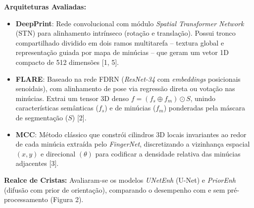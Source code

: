 \documentclass[12pt]{article}
\begin{document}
\begin{minipage}[t][89.8cm][s]{42.8cm}
  \noindent\textbf{Arquiteturas Avaliadas:}
  \begin{itemize}[leftmargin=1.1cm, itemsep=0.14cm, topsep=0.12cm, parsep=0pt]
    \item \textbf{DeepPrint}: Rede convolucional com módulo \textit{Spatial Transformer Network} (STN) para alinhamento intrínseco (rotação e translação). Possui tronco compartilhado dividido em dois ramos multitarefa -- textura global e representação guiada por mapa de minúcias -- que geram um vetor 1D compacto de 512 dimensões [1, 5].
    \item \textbf{FLARE}: Baseado na rede FDRN (\textit{ResNet-34} com \textit{embeddings} posicionais senoidais), com alinhamento de pose via regressão direta ou votação nas minúcias. Extrai um tensor 3D denso $f = (f_s \oplus f_m) \odot S$, unindo características semânticas ($f_s$) e de minúcias ($f_m$) ponderadas pela máscara de segmentação ($S$) [2].
    \item \textbf{MCC}: Método clássico que constrói cilindros 3D locais invariantes ao redor de cada minúcia extraída pelo \textit{FingerNet}, discretizando a vizinhança espacial $(x, y)$ e direcional $(\theta)$ para codificar a densidade relativa das minúcias adjacentes [3].
  \end{itemize}

  \noindent\textbf{Realce de Cristas:}
  Avaliaram-se os modelos \textit{UNetEnh} (U-Net) e \textit{PriorEnh} (difusão com prior de orientação), comparando o desempenho com e sem pré-processamento (Figura 2).


\end{minipage}
\end{document}
